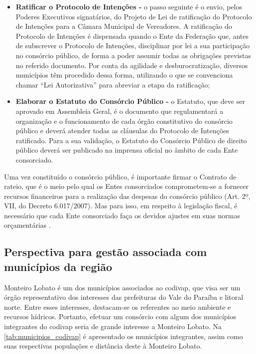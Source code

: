\begin{itemize}
	\item \textbf{Ratificar o Protocolo de Intenções -} o passo seguinte é o envio, pelos Poderes Executivos signatários, do Projeto de Lei de ratificação do Protocolo de Intenções para a Câmara Municipal de Vereadores. A ratificação do Protocolo de Intenções é dispensada quando o Ente da Federação que, antes de subscrever o Protocolo de Intenções, disciplinar por lei a sua participação no consórcio público, de forma a poder assumir todas as obrigações previstas no referido	documento. Por conta da agilidade e desburocratização, diversos municípios têm procedido dessa forma, utilizando o que se convenciona chamar “Lei Autorizativa” para abreviar a etapa da ratificação;
	
	\item \textbf{Elaborar o Estatuto do Consórcio Público -} o Estatuto, que deve ser aprovado em Assembleia Geral, é o documento que regulamentará a organização e o funcionamento de cada órgão constitutivo do consórcio público e deverá atender todas as cláusulas do Protocolo de Intenções ratificado. Para a sua validação, o Estatuto do Consórcio Público de direito público deverá ser publicado na imprensa oficial no	âmbito de cada Ente consorciado.
\end{itemize}

Uma vez constituído o consórcio público, é importante firmar o Contrato de rateio, que é o meio pelo qual os Entes consorciados comprometem-se a fornecer recursos financeiros para a realização das despesas do consórcio público (Art. 2º, VII, do Decreto 6.017/2007). Mas para isso, em respeito à legislação fiscal, é necessário que cada Ente consorciado faça os devidos ajustes em suas normas orçamentárias \cite{consorcio_publico}.

\subsection{Perspectiva para gestão associada com municípios da região}

Monteiro Lobato é um dos municípios associados ao \gls{codivap}, que visa ser um órgão representativo dos interesses das prefeituras do Vale do Paraíba e litoral norte. Entre esses interesses, destacam-se os referentes ao meio ambiente e recursos hídricos. Portanto, efetuar um consórcio com algum dos municípios integrantes do \gls{codivap} seria de grande interesse a Monteiro Lobato. Na \autoref{tab:municipios_codivap} é apresentado os municípios integrantes, assim como suas respectivas populações e distância deste à Monteiro Lobato.

